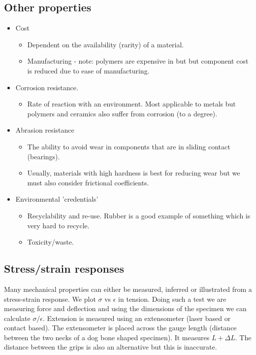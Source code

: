 \subsection{Other properties}
\begin{itemize}[noitemsep]
  \item Cost
        \begin{itemize}
          \item Dependent on the availability (rarity) of a material.
          \item Manufacturing - note: polymers are expensive in but but component cost is reduced due to ease of manufacturing.
        \end{itemize}
  \item Corrosion resistance.
        \begin{itemize}
          \item Rate of reaction with an environment. Most applicable to metals but polymers and ceramics also suffer from corrosion (to a degree).
        \end{itemize}
  \item Abrasion resistance
        \begin{itemize}
          \item The ability to avoid wear in components that are in sliding contact (bearings).
          \item Usually, materials with high hardness is best for reducing wear but we must also consider frictional coefficients.
        \end{itemize}
  \item Environmental 'credentials'
        \begin{itemize}
          \item Recyclability and re-use. Rubber is a good example of something which is very hard to recycle.
          \item Toxicity/waste.
        \end{itemize}
\end{itemize}
\subsection{Stress/strain responses}
Many mechanical properties can either be measured, inferred or illustrated from a stress-strain response. We plot \(\sigma\) vs \(\epsilon\) in tension. Doing such a test we are measuring force and deflection and using the dimensions of the specimen we can calculate \(\sigma/\epsilon\). Extension is measured using an extensometer (laser based or contact based). The extensometer is placed across the gauge length (distance between the two necks of a dog bone shaped specimen). It measures \(L + \Delta L\). The distance between the grips is also an alternative but this is inaccurate.

